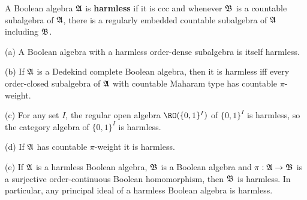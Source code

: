  A Boolean algebra $\frak A$ is
{\bf harmless} if it is ccc
and whenever $\frak B$ is a countable subalgebra of
$\frak A$, there is a regularly embedded countable subalgebra of $\frak A$
including $\frak B$.

 (a) A Boolean algebra with a harmless
order-dense subalgebra is itself harmless.

(b) If $\frak A$ is a Dedekind complete Boolean algebra, then it is
harmless iff
every order-closed subalgebra of $\frak A$ with countable Maharam type
has countable $\pi$-weight.

(c) For any set $I$, the regular open algebra $\RO(\{0,1\}^I)$
of $\{0,1\}^I$ is harmless, so the category algebra of $\{0,1\}^I$ is
harmless.

(d) If $\frak A$ has countable $\pi$-weight it is harmless.

(e) If $\frak A$ is a harmless Boolean algebra, $\frak B$ is a Boolean
algebra and $\pi:\frak A\to\frak B$ is a surjective order-continuous
Boolean homomorphism, then
$\frak B$ is harmless.   In particular,
any principal ideal of a harmless Boolean algebra is harmless.

